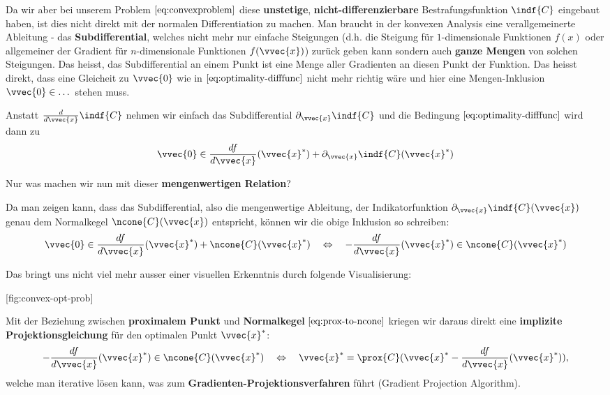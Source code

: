 \documentclass[
  british,
  12pt,
  paper=a4,
  twoside,
  titlepage=true,
  openright,
  abstract=on,
  toc=listofnumbered,
  numbers=noenddot,
  chapterprefix=true,
  headings=optiontohead,
  svgnames,
  dvipsnames]{scrreprt}
\begin{document}
Da wir aber bei unserem Problem \(\eqref{eq:convexproblem}\) diese
\textbf{unstetige}, \textbf{nicht-differenzierbare} Bestrafungsfunktion
\(\indf{C}\) eingebaut haben, ist dies nicht direkt mit der normalen
Differentiation zu machen. Man braucht in der konvexen Analysis eine
verallgemeinerte Ableitung - das \textbf{Subdifferential}, welches nicht
mehr nur einfache Steigungen (d.h. die Steigung für \(1\)-dimensionale
Funktionen \(f(x)\) oder allgemeiner der Gradient für \(n\)-dimensionale
Funktionen \(f(\vvec{x})\)) zurück geben kann sondern auch \textbf{ganze
Mengen} von solchen Steigungen. Das heisst, das Subdifferential an einem
Punkt ist eine Menge aller Gradienten an diesen Punkt der Funktion. Das
heisst direkt, dass eine Gleicheit zu \(\vvec{0}\) wie in
\(\eqref{eq:optimality-difffunc}\) nicht mehr richtig wäre und hier eine
Mengen-Inklusion \(\vvec{0} \in \dots\) stehen muss.

Anstatt \(\frac{d}{d\vvec{x}}\indf{C}\) nehmen wir einfach das
Subdifferential \(\partial_{\vvec{x}} \indf{C}\) und die Bedingung
\(\eqref{eq:optimality-difffunc}\) wird dann zu
\begin{align} \label{eq:optimality-strict-convex} \vvec{0} \in \frac{df}{d\vvec{x}}(\vvec{x}^*) + \partial_{\vvec{x}} \indf{C}(\vvec{x}^*) \end{align}

Nur was machen wir nun mit dieser \textbf{mengenwertigen Relation}?

Da man zeigen kann, dass das Subdifferential, also die mengenwertige
Ableitung, der Indikatorfunktion
\(\partial_{\vvec{x}} \indf{C}(\vvec{x})\) genau dem Normalkegel
\(\ncone{C}(\vvec{x})\) entspricht, können wir die obige Inklusion so
schreiben:
\begin{align} \vvec{0} \in \frac{df}{d\vvec{x}}(\vvec{x}^*) + \ncone{C}(\vvec{x}^*) \quad \Leftrightarrow \quad -\frac{df}{d\vvec{x}}(\vvec{x}^*) \in \ncone{C}(\vvec{x}^*) \label{eq:optimality-strict-convex-2} \end{align}

Das bringt uns nicht viel mehr ausser einer visuellen Erkenntnis durch
folgende Visualisierung:

[fig:convex-opt-prob]

Mit der Beziehung zwischen \textbf{proximalem Punkt} und
\textbf{Normalkegel} \(\eqref{eq:prox-to-ncone}\) kriegen wir daraus
direkt eine \textbf{implizite Projektionsgleichung} für den optimalen
Punkt \(\vvec{x}^*\):
\begin{align} -\frac{df}{d\vvec{x}}(\vvec{x}^*) \in \ncone{C}(\vvec{x}^*) \quad \Leftrightarrow \quad \vvec{x}^* = \prox{C}(\vvec{x}^* - \frac{df}{d\vvec{x}}(\vvec{x}^*)), \end{align}
welche man iterative lösen kann, was zum
\textbf{Gradienten-Projektionsverfahren} führt (Gradient Projection
Algorithm).
\end{document}
